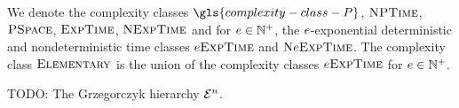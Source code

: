 We denote the complexity classes $\gls{complexity-class-P}$, $\cNP$,
$\cPSpace$, $\cExpTime$, $\cNExpTime$ and for $\expe \in \pNats$, the
$\expe$-exponential deterministic and nondeterministic time classes
$\ceExpTime\expe$ and $\ceNExpTime\expe$.
The complexity class $\cElementary$ is the union of the complexity classes
$\ceExpTime\expe$ for $\expe \in \pNats$.

TODO: The Grzegorczyk hierarchy $\Grz{n}$.